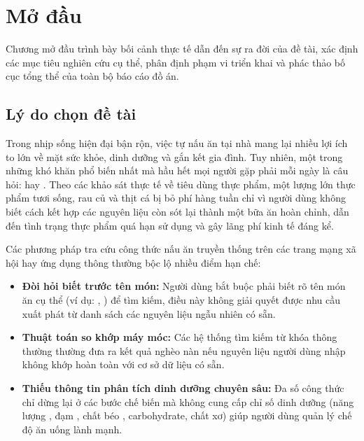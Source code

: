 \chapter{Mở đầu}
\label{ch:modau}

\begin{muctieu}
Chương mở đầu trình bày bối cảnh thực tế dẫn đến sự ra đời của đề tài, xác định các mục tiêu nghiên cứu cụ thể, phân định phạm vi triển khai và phác thảo bố cục tổng thể của toàn bộ báo cáo đồ án.
\end{muctieu}

\section{Lý do chọn đề tài}

Trong nhịp sống hiện đại bận rộn, việc tự nấu ăn tại nhà mang lại nhiều lợi ích to lớn về mặt sức khỏe, dinh dưỡng và gắn kết gia đình. Tuy nhiên, một trong những khó khăn phổ biến nhất mà hầu hết mọi người gặp phải mỗi ngày là câu hỏi:  hay . Theo các khảo sát thực tế về tiêu dùng thực phẩm, một lượng lớn thực phẩm tươi sống, rau củ và thịt cá bị bỏ phí hàng tuần chỉ vì người dùng không biết cách kết hợp các nguyên liệu còn sót lại thành một bữa ăn hoàn chỉnh, dẫn đến tình trạng thực phẩm quá hạn sử dụng và gây lãng phí kinh tế đáng kể.

Các phương pháp tra cứu công thức nấu ăn truyền thống trên các trang mạng xã hội hay ứng dụng thông thường bộc lộ nhiều điểm hạn chế:
\begin{itemize}[leftmargin=1.6em, itemsep=2pt]
  \item \textbf{Đòi hỏi biết trước tên món:} Người dùng bắt buộc phải biết rõ tên món ăn cụ thể (ví dụ: , ) để tìm kiếm, điều này không giải quyết được nhu cầu xuất phát từ danh sách các nguyên liệu ngẫu nhiên có sẵn.
  \item \textbf{Thuật toán so khớp máy móc:} Các hệ thống tìm kiếm từ khóa thông thường thường đưa ra kết quả nghèo nàn nếu nguyên liệu người dùng nhập không khớp hoàn toàn với cơ sở dữ liệu có sẵn.
  \item \textbf{Thiếu thông tin phân tích dinh dưỡng chuyên sâu:} Đa số công thức chỉ dừng lại ở các bước chế biến mà không cung cấp chỉ số dinh dưỡng (năng lượng , đạm , chất béo , carbohydrate, chất xơ) giúp người dùng quản lý chế độ ăn uống lành mạnh.
\end{itemize}

